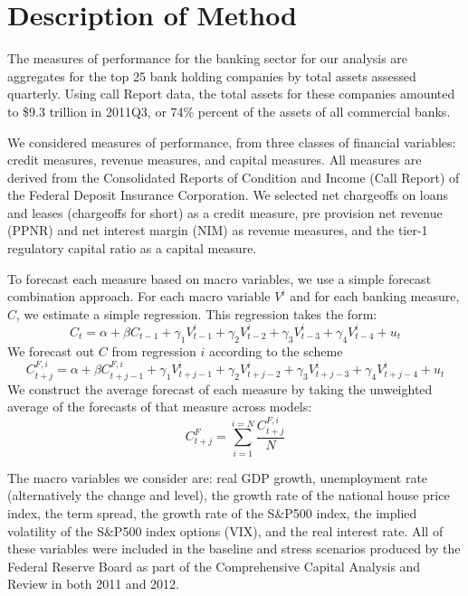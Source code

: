 \documentclass[12pt]{article}
\begin{document}
\section{Description of Method} \label{Section_modelanddata}

The measures of performance for the banking sector for our
analysis are aggregates for the top 25 bank holding companies by
total assets assessed quarterly. Using call Report data, the total
assets for these companies amounted to \$9.3 trillion in 2011Q3,
or 74\% percent of the assets of all commercial banks.

We considered measures of performance, from three classes of
financial variables: credit measures, revenue measures, and
capital measures. All measures are derived from the Consolidated
Reports of Condition and Income (Call Report) of the Federal
Deposit Insurance Corporation. We selected net chargeoffs on loans
and leases (chargeoffs for short) as a credit measure, pre
provision net revenue (PPNR) and net interest margin (NIM) as
revenue measures, and the tier-1 regulatory capital ratio as a
capital measure.

To forecast each measure based on macro variables, we use a simple
forecast combination approach. For each macro variable $V^i$ and
for each banking measure, $C$, we estimate a simple regression.
This regression takes the form:
\begin{equation}
C_t=\alpha+ \beta C_{t-1}+\gamma_1 V^i_{t-1}+ \gamma_2 V^i_{t-2}+
\gamma_3 V^{i}_{t-3}+ \gamma_4 V^{i}_{t-4}+u_t
\end{equation}
We forecast out $C$ from regression $i$ according to the scheme
\begin{equation}
C^{F,i}_{t+j}=\alpha+ \beta C^{F,i}_{t+j-1}+\gamma_1 V^i_{t+j-1}+
\gamma_2 V^i_{t+j-2}+ \gamma_3 V^{i}_{t+j-3}+ \gamma_4
V^{i}_{t+j-4}+u_t
\end{equation}
We construct the average forecast of each measure by taking the
unweighted average of the forecasts of that measure across models:
\begin{equation}
C^F_{t+j}= \sum_{i=1}^{i=N} \frac{C^{F,i}_{t+j}}{N}
\end{equation}

The macro variables we consider are: real GDP growth, unemployment
rate (alternatively the change and level), the growth rate of the
national house price index, the term spread, the growth rate of
the S\&P500 index, the implied volatility of the S\&P500 index
options (VIX), and the real interest rate. All of these variables
were included in the baseline and stress scenarios produced by the
Federal Reserve Board as part of the Comprehensive Capital
Analysis and Review in both 2011 and 2012.
\end{document}
